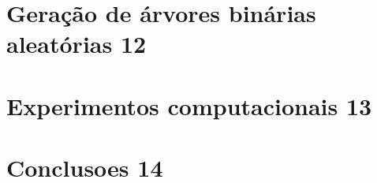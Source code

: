 \documentclass[a4paper,12pt]{article}
\begin{document}
\section {Geração de árvores binárias aleatórias 12}



\section {Experimentos computacionais 13}



\section {Conclusoes 14}



\newpage


\end{document}
